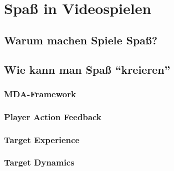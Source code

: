 \chapter{Spaß in Videospielen}

\section{Warum machen Spiele Spaß?}

\section{Wie kann man Spaß "`kreieren"'}

\subsection{MDA-Framework}

\subsection{Player Action Feedback}

\subsection{Target Experience}

\subsection{Target Dynamics}
